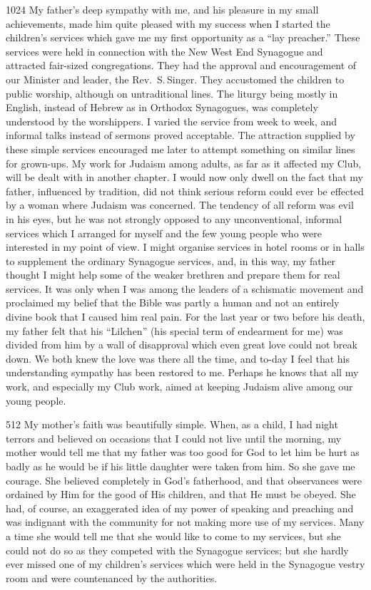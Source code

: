 \begin{tp}{1024}
My father’s deep sympathy with me, and his pleasure
in my small achievements, made him quite pleased with
my success when I started the children’s services which
gave me my first opportunity as a “lay preacher.” These
services were held in connection with the New West End
Synagogue and attracted fair-sized congregations. They
had the approval and encouragement of our Minister and
leader, the Rev.\ S.\,Singer. They accustomed the children
to public worship, although on untraditional lines. The
liturgy being mostly in English, instead of Hebrew as in
Orthodox Synagogues, was completely understood by the
worshippers. I varied the service from week to week, and
informal talks instead of sermons proved acceptable. The
attraction supplied by these simple services encouraged
me later to attempt something on similar lines for grown-ups.
My work for Judaism among adults, as far
as it affected my Club, will be dealt with in another
chapter. I would now only dwell on the fact that my
father, influenced by tradition, did not think serious
reform could ever be effected by a woman where Judaism
was concerned. The tendency of all reform was evil in
his eyes, but he was not strongly opposed to any
unconventional, informal services which I arranged for myself
and the few young people who were interested in my
point of view. I might organise services in hotel rooms or
in halls to supplement the ordinary Synagogue services,
and, in this way, my father thought I might help some
of the weaker brethren and prepare them for real services.
It was only when I was among the leaders of a
schismatic movement and proclaimed my belief that the
Bible was partly a human and not an entirely divine book
that I caused him real pain. For the last year or two
before his death, my father felt that his “Lilchen” (his
special term of endearment for me) was divided from
him by a wall of disapproval which even great love could
not break down. We both knew the love was there all the
time, and to-day I feel that his understanding sympathy
has been restored to me. Perhaps he knows that all my
work, and especially my Club work, aimed at keeping
Judaism alive among our young people.
\end{tp}

\begin{tp}{512}
My mother’s faith was beautifully simple. When, as a
child, I had night terrors and believed on occasions that
I could not live until the morning, my mother would tell
me that my father was too good for God to let him be
hurt as badly as he would be if his little daughter were
taken from him. So she gave me courage. She believed
completely in God’s fatherhood, and that observances
were ordained by Him for the good of His children, and
that He must be obeyed. She had, of course, an exaggerated
idea of my power of speaking and preaching and
was indignant with the community for not making more
use of my services. Many a time she would tell me that
she would like to come to my services, but she could not
do so as they competed with the Synagogue services; but
she hardly ever missed one of my children’s services which
were held in the Synagogue vestry room and were
countenanced by the authorities.
\end{tp}

